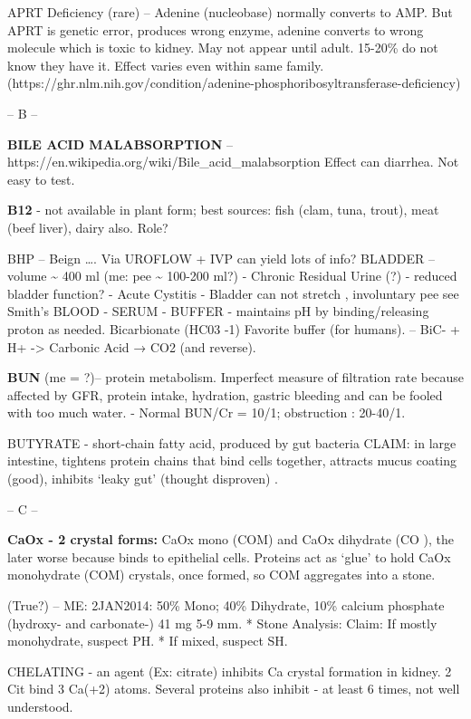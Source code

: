 APRT Deficiency (rare) -- Adenine (nucleobase) normally converts to AMP.
But APRT is genetic error, produces wrong enzyme, adenine converts to
wrong molecule which is toxic to kidney. May not appear until adult.
15-20\% do not know they have it. Effect varies even within same family.
(https://ghr.nlm.nih.gov/condition/adenine-phosphoribosyltransferase-deficiency)

-- B --

\textbf{BILE ACID MALABSORPTION} --
https://en.wikipedia.org/wiki/Bile\_acid\_malabsorption Effect can
diarrhea. Not easy to test.

\textbf{B12} - not available in plant form; best sources: fish (clam,
tuna, trout), meat (beef liver), dairy also. Role?

BHP -- Beign \ldots. Via UROFLOW + IVP can yield lots of info? BLADDER
-- volume \textasciitilde{} 400 ml (me: pee \textasciitilde{} 100-200
ml?) - Chronic Residual Urine (?) - reduced bladder function? - Acute
Cystitis - Bladder can not stretch , involuntary pee see Smith's BLOOD -
SERUM - BUFFER - maintains pH by binding/releasing proton as needed.
Bicarbionate (HC03 -1) Favorite buffer (for humans). -- BiC- + H+
-\textgreater{} Carbonic Acid → CO2 (and reverse).

\textbf{BUN} (me = ?)-- protein metabolism. Imperfect measure of
filtration rate because affected by GFR, protein intake, hydration,
gastric bleeding and can be fooled with too much water. - Normal BUN/Cr
= 10/1; obstruction : 20-40/1.

BUTYRATE - short-chain fatty acid, produced by gut bacteria CLAIM: in
large intestine, tightens protein chains that bind cells together,
attracts mucus coating (good), inhibits `leaky gut' (thought disproven)
.

-- C --

\textbf{CaOx - 2 crystal forms:} CaOx mono (COM) and CaOx dihydrate (CO
), the later worse because binds to epithelial cells. Proteins act as
`glue' to hold CaOx monohydrate (COM) crystals, once formed, so COM
aggregates into a stone.

(True?) -- ME: 2JAN2014: 50\% Mono; 40\% Dihydrate, 10\% calcium
phosphate (hydroxy- and carbonate-) \textbar{} 41 mg \textbar{} 5-9 mm.
* Stone Analysis: Claim: If mostly monohydrate, suspect PH. * If mixed,
suspect SH.

CHELATING - an agent (Ex: citrate) inhibits Ca crystal formation in
kidney. 2 Cit bind 3 Ca(+2) atoms. Several proteins also inhibit - at
least 6 times, not well understood.

